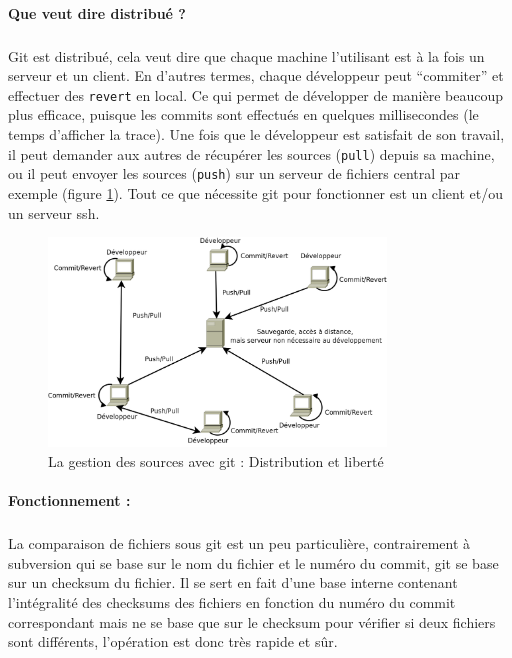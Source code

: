 \paragraph{Que veut dire distribué ?} 
\subparagraph{}Git est distribué, cela veut dire que chaque machine l'utilisant est à la fois un serveur et un client. En d'autres termes, chaque développeur peut ``commiter'' et effectuer des \verb|revert| en local. Ce qui permet de développer de manière beaucoup plus efficace, puisque les commits sont effectués en quelques millisecondes (le temps d'afficher la trace). Une fois que le développeur est satisfait de son travail, il peut demander aux autres de récupérer les sources (\verb|pull|)  depuis sa machine, ou il peut  envoyer les sources (\verb|push|) sur un serveur de fichiers central par exemple (figure \ref{git}). Tout ce que nécessite git pour fonctionner est un client et/ou un serveur ssh.


\begin{figure}[H]
\begin{center}
        \includegraphics[width=0.8\textwidth]{./schema/git.png}
\caption{La gestion des sources avec git : Distribution et liberté}
\label{git}
\end{center}
\end{figure}

\paragraph{Fonctionnement :} 
\subparagraph{}La comparaison de fichiers sous git est un peu particulière, contrairement à subversion qui se base sur le nom du fichier et le numéro du commit, git se base sur un checksum du fichier. Il se sert en fait d'une base interne contenant l'intégralité des checksums des fichiers en fonction du numéro du commit correspondant mais ne se base que sur le checksum pour vérifier si deux fichiers sont différents, l'opération est donc très rapide et sûr.

